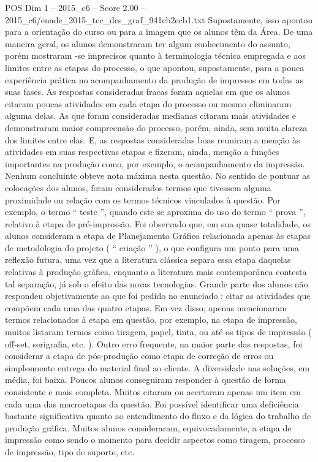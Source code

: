 \begin{textsample}{POS Dim 1 – 2015\_c6 – Score 2.00 – 2015\_c6/enade\_2015\_tec\_des\_graf\_941cb2ecb1.txt}
Supostamente, isso apontou para a orientação do curso ou para a imagem que os alunos têm da Área.
De uma maneira geral, os alunos demonstraram ter algum conhecimento do assunto, porém mostraram -se imprecisos quanto à terminologia técnica empregada e aos limites entre as etapas do processo, o que apontou, supostamente, para a pouca experiência prática no acompanhamento da produção de impressos em todas as suas fases.
As respostas consideradas fracas foram aquelas em que os alunos citaram poucas atividades em cada etapa do processo ou mesmo eliminaram alguma delas.
As que foram consideradas medianas citaram mais atividades e demonstraram maior compreensão do processo, porém, ainda, sem muita clareza dos limites entre elas.
E, as respostas consideradas boas reuniram a menção às atividades em suas respectivas etapas e fizeram, ainda, menção a funções importantes na produção como, por exemplo, o acompanhamento da impressão.
Nenhum concluinte obteve nota máxima nesta questão.
No sentido de pontuar as colocações dos alunos, foram considerados termos que tivessem alguma proximidade ou relação com os termos técnicos vinculados à questão.
Por exemplo, o termo “ teste ”, quando este se aproxima do uso do termo “ prova ”, relativo à etapa de pré-impressão.
Foi observado que, em sua quase totalidade, os alunos consideram a etapa de Planejamento Gráfico relacionada apenas às etapas de metodologia do projeto ( “ criação ” ), o que configura um ponto para uma reflexão futura, uma vez que a literatura clássica separa essa etapa daquelas relativas à produção gráfica, enquanto a literatura mais contemporânea contesta tal separação, já sob o efeito das novas tecnologias.
Grande parte dos alunos não respondeu objetivamente ao que foi pedido no enunciado : citar as atividades que compõem cada uma das quatro etapas.
Em vez disso, apenas mencionaram termos relacionados à etapa em questão, por exemplo, na etapa de impressão, muitos listaram termos como tiragem, papel, tinta, ou até os tipos de impressão ( off-set, serigrafia, etc. ).
Outro erro frequente, na maior parte das respostas, foi considerar a etapa de pós-produção como etapa de correção de erros ou simplesmente entrega do material final ao cliente.
A diversidade nas soluções, em média, foi baixa.
Poucos alunos conseguiram responder à questão de forma consistente e mais completa.
Muitos citaram ou acertaram apenas um item em cada uma das macroetapas da questão.
Foi possível identificar uma deficiência bastante significativa quanto ao entendimento do fluxo e da lógica do trabalho de produção gráfica.
Muitos alunos consideraram, equivocadamente, a etapa de impressão como sendo o momento para decidir aspectos como tiragem, processo de impressão, tipo de suporte, etc.

\end{textsample}
